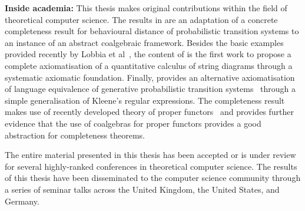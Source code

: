 \begin{impactstatement}
\textbf{Inside academia:} This thesis makes original contributions within the field of theoretical computer science. The results in  are an adaptation of a concrete completeness result for behavioural distance of probabilistic transition systems to an instance of an abstract coalgebraic framework. Besides the basic examples provided recently by Lobbia et al~\cite{Lobbia:2024:Quantitative}, the content of  is the first work to propose a complete axiomatisation of a quantitative calculus of string diagrams through a systematic axiomatic foundation. Finally,  provides an alternative axiomatisation of language equivalence of generative probabilistic transition systems~\cite{Glabbeek:1995:Reactive} through a simple generalisation of Kleene’s regular expressions. The completeness result makes use of recently developed theory of proper functors~\cite{Milius:2018:Proper} and provides further evidence that the use of coalgebras for proper functors provides a good abstraction for completeness theorems.

The entire material presented in this thesis has been accepted or is under review for several highly-ranked conferences in theoretical computer science. The results of this thesis have been disseminated to the computer science community through a series of seminar talks across the United Kingdom, the United States, and Germany. 
\end{impactstatement}


